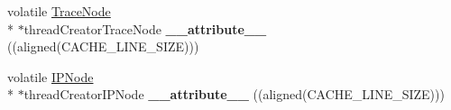 \begin{DoxyCompactItemize}
\item 
\hypertarget{structPinCCTLib_1_1CCT__LIB__GLOBAL__STATE_a3ece9a1c8cbe0f01acad482cac42c077}{volatile \hyperlink{structPinCCTLib_1_1TraceNode}{Trace\-Node} \\*
$\ast$thread\-Creator\-Trace\-Node {\bfseries \-\_\-\-\_\-attribute\-\_\-\-\_\-} ((aligned(C\-A\-C\-H\-E\-\_\-\-L\-I\-N\-E\-\_\-\-S\-I\-Z\-E)))}\label{structPinCCTLib_1_1CCT__LIB__GLOBAL__STATE_a3ece9a1c8cbe0f01acad482cac42c077}

\item 
\hypertarget{structPinCCTLib_1_1CCT__LIB__GLOBAL__STATE_aad091961f10b645b8ef6a5f8399f37be}{volatile \hyperlink{structPinCCTLib_1_1IPNode}{I\-P\-Node} \\*
$\ast$thread\-Creator\-I\-P\-Node {\bfseries \-\_\-\-\_\-attribute\-\_\-\-\_\-} ((aligned(C\-A\-C\-H\-E\-\_\-\-L\-I\-N\-E\-\_\-\-S\-I\-Z\-E)))}\label{structPinCCTLib_1_1CCT__LIB__GLOBAL__STATE_aad091961f10b645b8ef6a5f8399f37be}

\end{DoxyCompactItemize}

